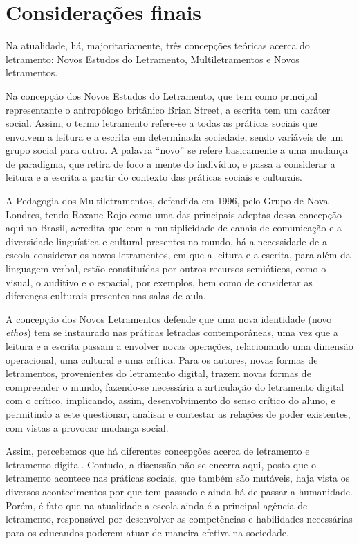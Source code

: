 \documentclass{textolivre}
\begin{document}
\section{Considerações finais}\label{sec-consideracoes-finais}
Na atualidade, há, majoritariamente, três concepções teóricas acerca do
letramento: Novos Estudos do Letramento, Multiletramentos e Novos letramentos.

Na concepção dos Novos Estudos do Letramento, que tem como principal
representante o antropólogo britânico Brian Street, a escrita tem um caráter
social. Assim, o termo letramento refere-se a todas as práticas sociais que
envolvem a leitura e a escrita em determinada sociedade, sendo variáveis de um
grupo social para outro. A palavra “novo” se refere basicamente a uma mudança
de paradigma, que retira de foco a mente do indivíduo, e passa a considerar a
leitura e a escrita a partir do contexto das práticas sociais e culturais.

A Pedagogia dos Multiletramentos, defendida em 1996, pelo Grupo de Nova
Londres, tendo Roxane Rojo como uma das principais adeptas dessa concepção aqui
no Brasil, acredita que com a multiplicidade de canais de comunicação e a
diversidade linguística e cultural presentes no mundo, há a necessidade de a
escola considerar os novos letramentos, em que a leitura e a escrita, para além
da linguagem verbal, estão constituídas por outros recursos semióticos, como o
visual, o auditivo e o espacial, por exemplos, bem como de considerar as
diferenças culturais presentes nas salas de aula.

A concepção dos Novos Letramentos defende que uma nova identidade (novo \emph{ethos})
tem se instaurado nas práticas letradas contemporâneas, uma vez que a leitura e
a escrita passam a envolver novas operações, relacionando uma dimensão
operacional, uma cultural e uma crítica. Para os autores, novas formas de
letramentos, provenientes do letramento digital, trazem novas formas de
compreender o mundo, fazendo-se necessária a articulação do letramento digital
com o crítico, implicando, assim, desenvolvimento do senso crítico do aluno, e
permitindo a este questionar, analisar e contestar as relações de poder
existentes, com vistas a provocar mudança social.

Assim, percebemos que há diferentes concepções acerca de letramento e
letramento digital. Contudo, a discussão não se encerra aqui, posto que o
letramento acontece nas práticas sociais, que também são mutáveis, haja vista
os diversos acontecimentos por que tem passado e ainda há de passar a
humanidade. Porém, é fato que na atualidade a escola ainda é a principal
agência de letramento, responsável por desenvolver as competências e
habilidades necessárias para os educandos poderem atuar de maneira efetiva na
sociedade.


\printbibliography\label{sec-bib}
\end{document}
